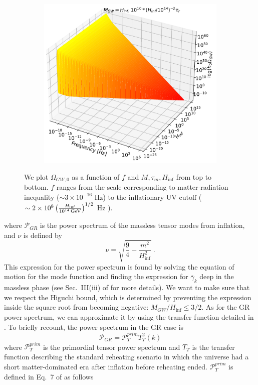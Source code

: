 \documentclass[prd,twocolumn,aps,psfig,nofootinbib,nobibnotes,superscriptaddress,preprintnumbers,times]{revtex4-2}
\newcommand{\GeV}{\,{\rm GeV}}
\begin{document}
\begin{figure}[H]
\begin{subfigure}{.5\textwidth}
  \centering
  \includegraphics[width=.82\linewidth]{fig/fig4c.pdf}  
  \label{fig:contour-c}
\end{subfigure}
\caption{We plot $\Omega_{GW,0}$ as a function of $f$ and $M, \tau_m, H_{\inf}$ from top to bottom. $f$ ranges from the scale corresponding to matter-radiation inequality ($\sim 3\times10^{-16}$ Hz) to the inflationary UV cutoff ($\sim 2\times 10^8\left(\frac{H_{\inf}}{10^{14} \GeV}\right)^{1/2}$ Hz \cite{Fujita:2018}).} 
\label{fig:contours}
\end{figure}
\hspace{-1em}where $\mathcal{P}_{GR}$ is the power spectrum of the massless tensor modes from inflation, and $\nu$ is defined by 
\begin{equation}\label{eqn:21}
    \nu = \sqrt{\frac{9}{4} - \frac{m^2}{H_{\inf}^2}}\ .
\end{equation}
This expression for the power spectrum is found by solving the equation of motion for the mode function and finding the expression for $\overline{\gamma}_k$ deep in the massless phase (see Sec.\ III(iii) of \cite{Fujita:2018} for more details). We want to make sure that we respect the Higuchi bound, which is determined by preventing the expression inside the square root from becoming negative: $M_{GW}/H_{\inf} \leq 3/2$. As for the GR power spectrum, we can approximate it by using the transfer function detailed in \cite{Kuroyanagi:2015}. To briefly recount, the power spectrum in the GR case is %
\begin{equation}\label{eqn:22}
    \mathcal{P}_{GR} = \mathcal{P}^{prim}_{T} T^2_T(k)
\end{equation}
where $\mathcal{P}^{prim}_{T}$ is the primordial tensor power spectrum and $T_{T}$ is the transfer function describing the standard reheating scenario in which the universe had a short matter-dominated era after inflation before reheating ended. $\mathcal{P}^{prim}_{T}$ is defined 
in Eq.\ 7 of \cite{Kuroyanagi:2015} as follows
\end{document}
